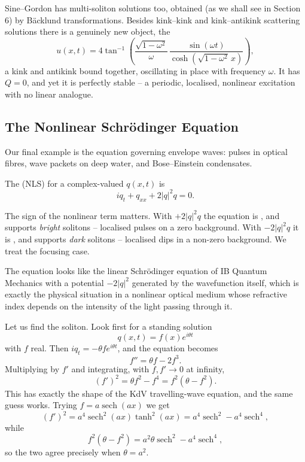 \documentclass[a4paper]{scrartcl}
\DeclareMathOperator{\sech}{sech}
\begin{document}
\begin{remark}
	Sine--Gordon has multi-soliton solutions too, obtained (as we shall see in Section 6) by B\"acklund transformations. Besides kink--kink and kink--antikink scattering solutions there is a genuinely new object, the 
	$$
	u(x,t) = 4\tan^{-1}\left(\frac{\sqrt{1-\omega^2}}{\omega}\,\frac{\sin(\omega t)}{\cosh\left(\sqrt{1-\omega^2}\,x\right)}\right),
	$$
	a kink and antikink bound together, oscillating in place with frequency $\omega$. It has $Q = 0$, and yet it is perfectly stable -- a periodic, localised, nonlinear excitation with no linear analogue.
\end{remark}

\subsection{The Nonlinear Schr\"odinger Equation}

Our final example is the equation governing envelope waves: pulses in optical fibres, wave packets on deep water, and Bose--Einstein condensates.

\begin{definition}
	The  (NLS) for a complex-valued $q(x,t)$ is
	$$
	iq_t + q_{xx} + 2|q|^2q = 0.
	$$
\end{definition}

The sign of the nonlinear term matters. With $+2|q|^2q$ the equation is , and supports \emph{bright} solitons -- localised pulses on a zero background. With $-2|q|^2q$ it is , and supports \emph{dark} solitons -- localised dips in a non-zero background. We treat the focusing case.

The equation looks like the linear Schr\"odinger equation of IB Quantum Mechanics with a potential $-2|q|^2$ generated by the wavefunction itself, which is exactly the physical situation in a nonlinear optical medium whose refractive index depends on the intensity of the light passing through it.

Let us find the soliton. Look first for a standing solution
$$
q(x,t) = f(x)e^{i\theta t}
$$
with $f$ real. Then $iq_t = -\theta fe^{i\theta t}$, and the equation becomes
$$
f'' = \theta f - 2f^3.
$$
Multiplying by $f'$ and integrating, with $f, f'\to0$ at infinity,
$$
(f')^2 = \theta f^2 - f^4 = f^2\left(\theta - f^2\right).
$$
This has exactly the shape of the KdV travelling-wave equation, and the same guess works. Trying $f = a\sech(ax)$ we get
$$
(f')^2 = a^4\sech^2(ax)\tanh^2(ax) = a^4\sech^2 - a^4\sech^4,
$$
while
$$
f^2(\theta - f^2) = a^2\theta\sech^2 - a^4\sech^4,
$$
so the two agree precisely when $\theta = a^2$.
\end{document}
